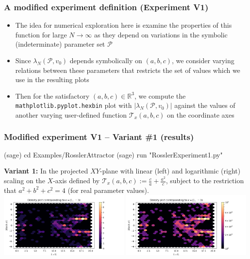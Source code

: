 \documentclass[usenames,svgnames,dvipsnames,10pt]{beamer}
\begin{document}
\begin{frame}
\frametitle{A modified experiment definition (Experiment V1)}

\begin{itemize} 

\item The idea for numerical exploration here is examine the properties of this function 
      for large $N \rightarrow \infty$ as they depend on variations in the symbolic (indeterminate) 
      parameter set $\mathcal{P}$ 
\item Since $\lambda_N(\mathcal{P}, v_0)$ depends symbolically on $(a, b, c)$, we consider varying relations between 
      these parameters that restricts the set of values which we use in the resulting plots  
\item Then for the satisfactory $(a, b, c) \in \mathbb{R}^3$, we compute the \texttt{mathplotlib.pyplot.hexbin} 
      plot with $|\lambda_N(\mathcal{P}, v_0)|$ against the values of another varying user-defined function 
      $\mathcal{T}_x(a, b, c)$ on the coordinate axes 

\end{itemize} 

\end{frame}

\begin{frame}[fragile]
\frametitle{Modified experiment V1 -- Variant \#1 (results)}

\begin{center}
\begin{code}
(sage) cd Examples/RosslerAttractor
(sage) run "RosslerExperiment1.py"
\end{code}
\textbf{Variant 1:} 
In the projected $XY$-plane with linear (left) and logarithmic (right) scaling on the $X$-axis defined by 
$\mathcal{T}_x(a, b, c) := \frac{c}{a} + \frac{a^2}{c}$, subject to the restriction that 
$a^2+b^2+c^2 = 4$ (for real parameter values). \\ 
\includegraphics[width=0.49\textwidth]{../Images/RosslerAttractorExpt1-Variant1-linearscale-TypeXY-2021-10-27-025740.png}
\includegraphics[width=0.49\textwidth]{../Images/RosslerAttractorExpt1-Variant1-logscale-TypeXY-2021-10-27-025253.png}
\end{center}

\end{frame}
\end{document}
